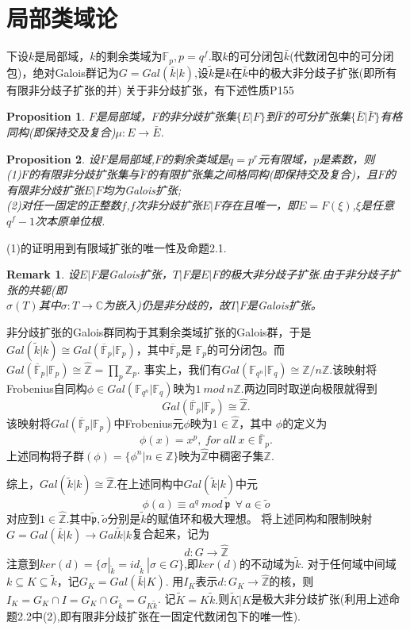 \documentclass[UTF8]{article}
\newtheorem{prop}{Proposition}[section]
\newtheorem{Rem}{Remark}[section]
\begin{document}
\section{局部类域论}
下设$k$是局部域，$k$的剩余类域为$\mathbb{F}_{p},p=q^{f}$.取$k$的可分闭包$\bar{k}$(代数闭包中的可分闭包)，绝对Galois群记为$G=Gal(\bar{k}|k)$,设$\tilde{k}$是$k$在$\bar{k}$中的极大非分歧子扩张(即所有有限非分歧子扩张的并)
关于非分歧扩张，有下述性质\cite{xkz}P155
\begin{prop}
	$F$是局部域，$F$的非分歧扩张集$\{E|F\}$到$\bar{F}$的可分扩张集$\{\bar{E}|\bar{F}\}$有格同构(即保持交及复合)$\mu:E\rightarrow \bar{E}$.
\end{prop}
\begin{prop}
	设$F$是局部域,$F$的剩余类域是$q=p^{r}$元有限域，$p$是素数，则\\
	(1)$F$的有限非分歧扩张集与$\bar{F}$的有限扩张集之间格同构(即保持交及复合)，且$F$的有限非分歧扩张$E|F$均为Galois扩张;\\	
	(2)对任一固定的正整数$f$,$f$次非分歧扩张$E|F$存在且唯一，即$E=F(\xi)$,$\xi$是任意$q^{f}-1$次本原单位根.
\end{prop}
(1)的证明用到有限域扩张的唯一性及命题2.1.
\begin{Rem}设$E|F$是Galois扩张，$T|F$是$E|F$的极大非分歧子扩张.由于非分歧子扩张的共轭(即\\
	$\sigma(T)$其中$\sigma:T\rightarrow\mathbb{C}$为嵌入)仍是非分歧的，故$T|F$是Galois扩张。
\end{Rem}
非分歧扩张的Galois群同构于其剩余类域扩张的Galois群，于是
$Gal(\tilde{k}|k)\cong Gal(\overline{\mathbb{F}}_{p}|\mathbb{F}_{p})$，其中$\overline{\mathbb{F}}_{p}$是
$\mathbb{F}_{p}$的可分闭包。而$Gal(\overline{\mathbb{F}}_{p}|\mathbb{F}_{p})\cong \widehat{\mathbb{Z}}=\prod_{p}\mathbb{Z}_{p}$.
事实上，我们有$Gal(\mathbb{F}_{q^{n}}|\mathbb{F}_{q})\cong \mathbb{Z}/n\mathbb{Z}$.该映射将Frobenius自同构$\phi\in Gal(\mathbb{F}_{q^{n}}|\mathbb{F}_{q})$映为$1\ mod \ n\mathbb{Z}$.两边同时取逆向极限就得到
$$Gal(\overline{\mathbb{F}}_{p}|\mathbb{F}_{p})\cong \widehat{\mathbb{Z}}.$$
该映射将$Gal(\overline{\mathbb{F}}_{p}|\mathbb{F}_{p})$中Frobenius元$\phi$映为$1\in \widehat{\mathbb{Z}}$，其中
$\phi$的定义为$$
\phi(x)=x^{p},\ for \ all \ x\in \overline{\mathbb{F}}_{p}.
$$
上述同构将子群$(\phi)=\{\phi^{n}|n\in \mathbb{Z}\}$映为$\widehat{\mathbb{Z}}$中稠密子集$\mathbb{Z}$.

综上，$Gal(\tilde{k}|k)\cong\widehat{\mathbb{Z}}$.在上述同构中$Gal(\tilde{k}|k)$中元
$$
\phi(a)\equiv a^{q}\ mod \ \tilde{\mathfrak{p}}\ \ \forall \ a\in \tilde{o}
$$
对应到$1\in\widehat{\mathbb{Z}}$.其中$\tilde{\mathfrak{p}},\tilde{o}$分别是$\tilde{k}$的赋值环和极大理想。
将上述同构和限制映射$G=Gal(\bar{k}|k)\rightarrow Gal{\tilde{k}|k}$复合起来，记为
$$
d:G\rightarrow \widehat{\mathbb{Z}}
$$
注意到$ker(d)=\{\sigma|_{\tilde{k}}=id_{\tilde{k}}\ |\sigma \in G\}$,即$ker(d)$的不动域为$\tilde{k}.$
对于任何域中间域$k\subseteq K\subseteq \tilde{k}$，记$G_{K}=Gal(\bar{k}|K)$.
用$I_{K}$表示$d:G_{K}\rightarrow \widehat{\mathbb{Z}}$的核，则
$I_{K}=G_{K}\cap I=G_{K}\cap G_{\tilde{k}}=G_{K\tilde{k}}$.
记$\widetilde{K}=K\tilde{k}.$则$\widetilde{K}|K$是极大非分歧扩张(利用上述命题2.2中(2),即有限非分歧扩张在一固定代数闭包下的唯一性).\\
\end{document}
